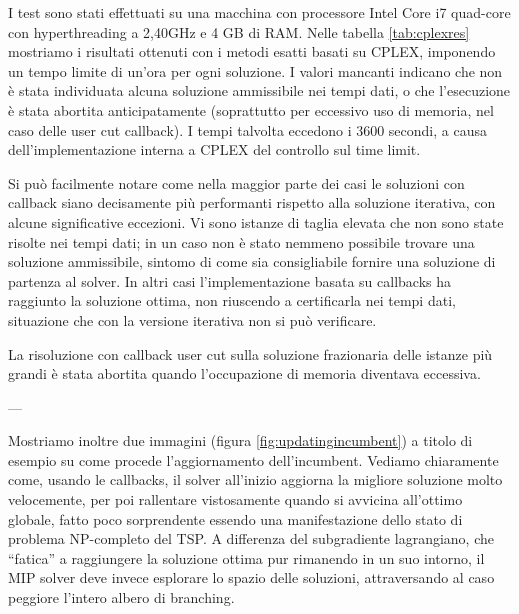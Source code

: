 I test sono stati effettuati su una macchina con processore Intel Core i7 quad-core con hyperthreading a 2,40GHz e 4 GB di RAM. Nelle tabella \ref{tab:cplexres} mostriamo i risultati ottenuti con i metodi esatti basati su CPLEX, imponendo un tempo limite di un'ora per ogni soluzione. I valori mancanti indicano che non è stata individuata alcuna soluzione ammissibile nei tempi dati, o che l'esecuzione è stata abortita anticipatamente (soprattutto per eccessivo uso di memoria, nel caso delle user cut callback). I tempi talvolta eccedono i 3600 secondi, a causa dell'implementazione interna a CPLEX del controllo sul time limit.

Si può facilmente notare come nella maggior parte dei casi le soluzioni con callback siano decisamente più performanti rispetto alla soluzione iterativa, con alcune significative eccezioni. Vi sono istanze di taglia elevata che non sono state risolte nei tempi dati; in un caso non è stato nemmeno possibile trovare una soluzione ammissibile, sintomo di come sia consigliabile fornire una soluzione di partenza al solver. In altri casi l'implementazione basata su callbacks ha raggiunto la soluzione ottima, non riuscendo a certificarla nei tempi dati, situazione che con la versione iterativa non si può verificare.

La risoluzione con callback user cut sulla soluzione frazionaria delle istanze più grandi è stata abortita quando l'occupazione di memoria diventava eccessiva.

---

Mostriamo inoltre due immagini (figura \ref{fig:updatingincumbent}) a titolo di esempio su come procede l'aggiornamento dell'incumbent. Vediamo chiaramente come, usando le callbacks, il solver all'inizio aggiorna la migliore soluzione molto velocemente, per poi rallentare vistosamente quando si avvicina all'ottimo globale, fatto poco sorprendente essendo una manifestazione dello stato di problema NP-completo del TSP. A differenza del subgradiente lagrangiano, che ``fatica'' a raggiungere la soluzione ottima pur rimanendo in un suo intorno, il MIP solver deve invece esplorare lo spazio delle soluzioni, attraversando al caso peggiore l'intero albero di branching.

